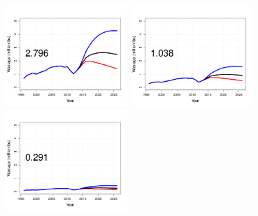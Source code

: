 \begin{figure}[htbp]
	\centering
		\includegraphics[height=1.5in]{../FIGURES/SIZELIMIT/fig_32_DI_WBio.pdf}
		\includegraphics[height=1.5in]{../FIGURES/SIZELIMIT/fig_29_DI_WBio.pdf}
		\includegraphics[height=1.5in]{../FIGURES/SIZELIMIT/fig_26_DI_WBio.pdf}
		                                                              

\end{figure}
